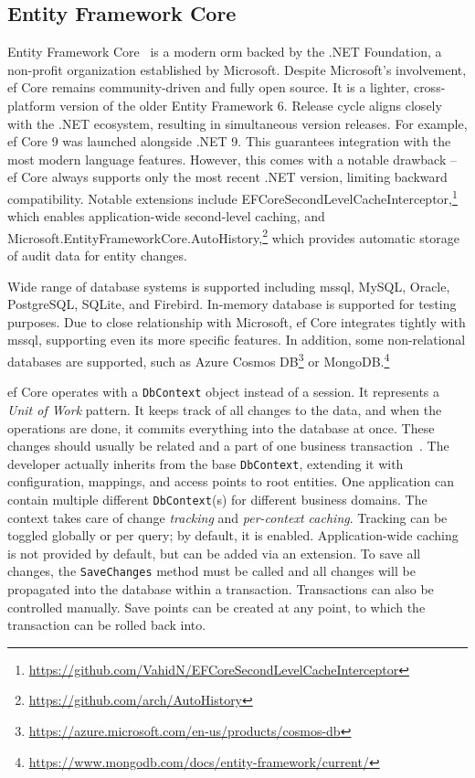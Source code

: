 \subsection{Entity Framework Core}
Entity Framework Core~\cite{efcore, efcoreRepo} is a modern \acrshort{orm} backed by the .NET Foundation, a non-profit organization established by Microsoft. Despite Microsoft's involvement, \acrshort{ef} Core remains community-driven and fully open source. It is a lighter, cross-platform version of the older Entity Framework 6. Release cycle aligns closely with the .NET ecosystem, resulting in simultaneous version releases. For example, \acrshort{ef} Core 9 was launched alongside .NET 9. This guarantees integration with the most modern language features. However, this comes with a notable drawback -- \acrshort{ef} Core always supports only the most recent .NET version, limiting backward compatibility. Notable extensions include EFCoreSecondLevelCacheInterceptor,\footnote{\url{https://github.com/VahidN/EFCoreSecondLevelCacheInterceptor}} which enables application-wide second-level caching, and Microsoft.EntityFrameworkCore.AutoHistory,\footnote{\url{https://github.com/arch/AutoHistory}} which provides automatic storage of audit data for entity changes.

Wide range of database systems is supported including \acrshort{mssql}, MySQL, Oracle, PostgreSQL, SQLite, and Firebird. In-memory database is supported for testing purposes. Due to close relationship with Microsoft, \acrshort{ef} Core integrates tightly with \acrshort{mssql}, supporting even its more specific features. In addition, some non-relational databases are supported, such as Azure Cosmos DB\footnote{\url{https://azure.microsoft.com/en-us/products/cosmos-db}} or MongoDB.\footnote{\url{https://www.mongodb.com/docs/entity-framework/current/}}

\acrshort{ef} Core operates with a \texttt{DbContext} object instead of a session. It represents a \textit{Unit of Work} pattern. It keeps track of all changes to the data, and when the operations are done, it commits everything into the database at once. These changes should usually be related and a part of one business transaction~\cite{FowlerUOW}. The developer actually inherits from the base \texttt{DbContext}, extending it with configuration, mappings, and access points to root entities. One application can contain multiple different \texttt{DbContext}(s) for different business domains. The context takes care of change \textit{tracking} and \textit{per-context caching}. Tracking can be toggled globally or per query; by default, it is enabled. Application-wide caching is not provided by default, but can be added via an extension. To save all changes, the \texttt{SaveChanges} method must be called and all changes will be propagated into the database within a transaction. Transactions can also be controlled manually. Save points can be created at any point, to which the transaction can be rolled back into.

